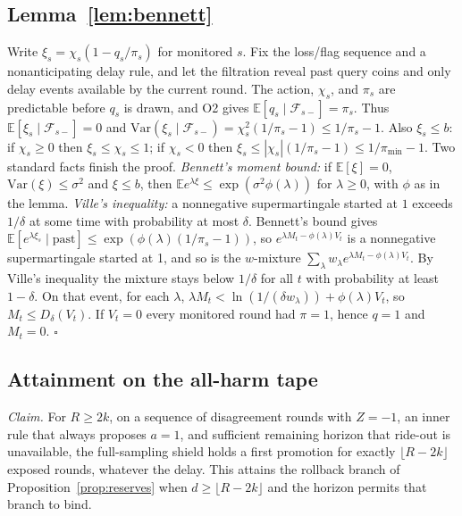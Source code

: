 \documentclass[10pt]{article}
\theoremstyle{plain}
\theoremstyle{definition}
\newcommand{\E}{\mathbb{E}}
\begin{document}
\subsection{Lemma~\ref{lem:bennett}}
Write $\xi_s=\chi_s(1-q_s/\pi_s)$ for monitored $s$. Fix the loss/flag sequence and a nonanticipating delay rule, and let the filtration reveal past query coins and only delay events available by the current round. The action, $\chi_s$, and $\pi_s$ are predictable before $q_s$ is drawn, and O2 gives $\E[q_s\mid\mathcal F_{s-}]=\pi_s$. Thus $\E[\xi_s\mid\mathcal F_{s-}]=0$ and $\mathrm{Var}(\xi_s\mid\mathcal F_{s-})=\chi_s^2(1/\pi_s-1)\le1/\pi_s-1$. Also $\xi_s\le b$: if $\chi_s\ge0$ then $\xi_s\le\chi_s\le1$; if $\chi_s<0$ then $\xi_s\le|\chi_s|(1/\pi_s-1)\le1/\pi_{\min}-1$. Two standard facts finish the proof. \emph{Bennett's moment bound:} if $\E[\xi]=0$, $\mathrm{Var}(\xi)\le\sigma^2$ and $\xi\le b$, then $\E e^{\lambda\xi}\le\exp(\sigma^2\phi(\lambda))$ for $\lambda\ge0$, with $\phi$ as in the lemma. \emph{Ville's inequality:} a nonnegative supermartingale started at $1$ exceeds $1/\delta$ at some time with probability at most $\delta$. Bennett's bound gives $\E[e^{\lambda\xi_s}\mid\text{past}]\le\exp(\phi(\lambda)(1/\pi_s-1))$, so $e^{\lambda M_t-\phi(\lambda)V_t}$ is a nonnegative supermartingale started at 1, and so is the $w$-mixture $\sum_\lambda w_\lambda e^{\lambda M_t-\phi(\lambda)V_t}$. By Ville's inequality the mixture stays below $1/\delta$ for all $t$ with probability at least $1-\delta$. On that event, for each $\lambda$, $\lambda M_t<\ln(1/(\delta w_\lambda))+\phi(\lambda)V_t$, so $M_t\le D_\delta(V_t)$. If $V_t=0$ every monitored round had $\pi=1$, hence $q=1$ and $M_t=0$. $\square$

\subsection{Attainment on the all-harm tape}
\emph{Claim.} For $R\ge2k$, on a sequence of disagreement rounds with $Z=-1$, an inner rule that always proposes $a=1$, and sufficient remaining horizon that ride-out is unavailable, the full-sampling shield holds a first promotion for exactly $\lfloor R-2k\rfloor$ exposed rounds, whatever the delay. This attains the rollback branch of Proposition~\ref{prop:reserves} when $d\ge\lfloor R-2k\rfloor$ and the horizon permits that branch to bind.
\end{document}
